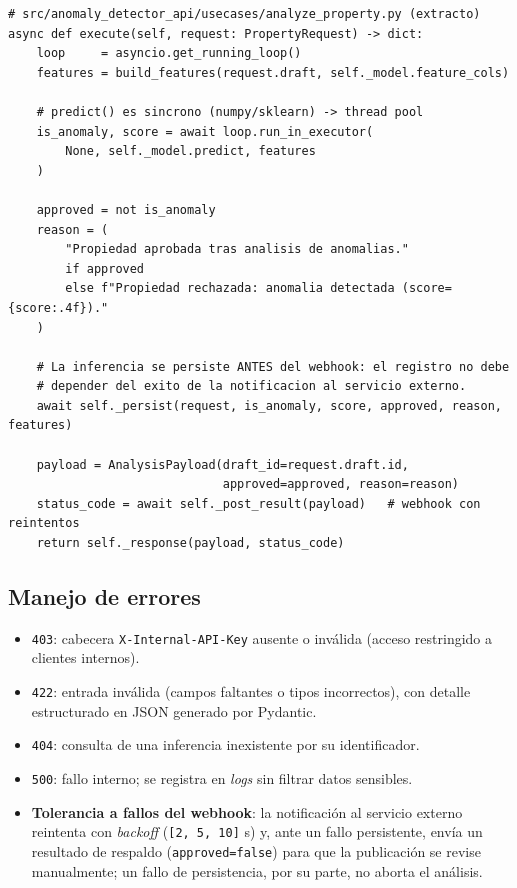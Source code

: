 \begin{lstlisting}[style=pythonstyle]
# src/anomaly_detector_api/usecases/analyze_property.py (extracto)
async def execute(self, request: PropertyRequest) -> dict:
    loop     = asyncio.get_running_loop()
    features = build_features(request.draft, self._model.feature_cols)

    # predict() es sincrono (numpy/sklearn) -> thread pool
    is_anomaly, score = await loop.run_in_executor(
        None, self._model.predict, features
    )

    approved = not is_anomaly
    reason = (
        "Propiedad aprobada tras analisis de anomalias."
        if approved
        else f"Propiedad rechazada: anomalia detectada (score={score:.4f})."
    )

    # La inferencia se persiste ANTES del webhook: el registro no debe
    # depender del exito de la notificacion al servicio externo.
    await self._persist(request, is_anomaly, score, approved, reason, features)

    payload = AnalysisPayload(draft_id=request.draft.id,
                              approved=approved, reason=reason)
    status_code = await self._post_result(payload)   # webhook con reintentos
    return self._response(payload, status_code)
\end{lstlisting}

\subsection{Manejo de errores}

\begin{itemize}
  \item \texttt{403}: cabecera \texttt{X-Internal-API-Key} ausente o inválida
  (acceso restringido a clientes internos).
  \item \texttt{422}: entrada inválida (campos faltantes o tipos incorrectos),
  con detalle estructurado en JSON generado por Pydantic.
  \item \texttt{404}: consulta de una inferencia inexistente por su identificador.
  \item \texttt{500}: fallo interno; se registra en \textit{logs} sin filtrar
  datos sensibles.
  \item \textbf{Tolerancia a fallos del webhook}: la notificación al servicio
  externo reintenta con \textit{backoff} (\texttt{[2, 5, 10]} s) y, ante un fallo
  persistente, envía un resultado de respaldo (\texttt{approved=false}) para que
  la publicación se revise manualmente; un fallo de persistencia, por su parte,
  no aborta el análisis.
\end{itemize}

